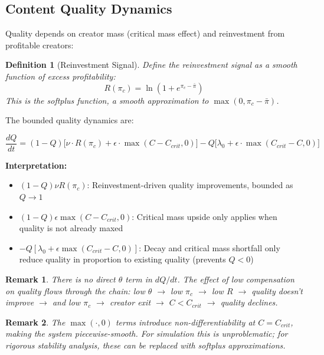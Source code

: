 \documentclass[11pt,a4paper]{article}
\newtheorem{definition}{Definition}
\newtheorem{remark}{Remark}
\begin{document}
\subsection{Content Quality Dynamics}

Quality depends on creator mass (critical mass effect) and reinvestment from profitable creators:

\begin{definition}[Reinvestment Signal]
Define the reinvestment signal as a smooth function of excess profitability:
\begin{equation}
R(\pi_c) = \ln(1 + e^{\pi_c - \bar{\pi}})
\end{equation}
This is the softplus function, a smooth approximation to $\max(0, \pi_c - \bar{\pi})$.
\end{definition}

The bounded quality dynamics are:

\begin{equation}
\boxed{
\frac{dQ}{dt} = (1-Q)\Big[\nu \cdot R(\pi_c) + \epsilon \cdot \max(C - C_{crit}, 0)\Big] - Q\Big[\lambda_0 + \epsilon \cdot \max(C_{crit} - C, 0)\Big]
}
\end{equation}

\textbf{Interpretation:}
\begin{itemize}
    \item $(1-Q)\nu R(\pi_c)$: Reinvestment-driven quality improvements, bounded as $Q \to 1$
    \item $(1-Q)\epsilon\max(C - C_{crit}, 0)$: Critical mass upside only applies when quality is not already maxed
    \item $-Q[\lambda_0 + \epsilon\max(C_{crit} - C, 0)]$: Decay and critical mass shortfall only reduce quality in proportion to existing quality (prevents $Q < 0$)
\end{itemize}

\begin{remark}
There is no direct $\theta$ term in $dQ/dt$. The effect of low compensation on quality flows through the chain: low $\theta$ $\rightarrow$ low $\pi_c$ $\rightarrow$ low $R$ $\rightarrow$ quality doesn't improve $\rightarrow$ and low $\pi_c$ $\rightarrow$ creator exit $\rightarrow$ $C < C_{crit}$ $\rightarrow$ quality declines.
\end{remark}

\begin{remark}
The $\max(\cdot, 0)$ terms introduce non-differentiability at $C = C_{crit}$, making the system piecewise-smooth. For simulation this is unproblematic; for rigorous stability analysis, these can be replaced with softplus approximations.
\end{remark}
\end{document}
